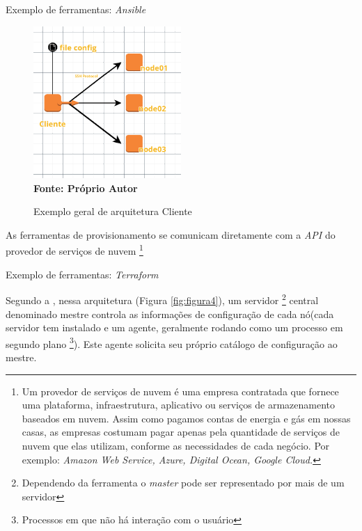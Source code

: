 Exemplo de ferramentas: \textit{Ansible}

\begin{figure}[ht]
	\centering	
	\caption[\hspace{0.1cm}Exemplo arquitetura Cliente]{Exemplo geral de arquitetura Cliente}
	\vspace{-0.4cm}
	\includegraphics[width=0.5\textwidth]{figuras/cliente.png}
	 \vspace{-0.2cm}
	\\\textbf{\footnotesize Fonte: Próprio Autor}
	\label{fig:figura3}
\end{figure}
\vspace{-0.5cm}


As ferramentas de provisionamento se comunicam diretamente com a \textit{API} do provedor de serviços de nuvem \footnote{Um provedor de serviços de nuvem é uma empresa contratada que fornece uma plataforma, infraestrutura, aplicativo ou serviços de armazenamento baseados em nuvem. Assim como pagamos contas de energia e gás em nossas casas, as empresas costumam pagar apenas pela quantidade de serviços de nuvem que elas utilizam, conforme as necessidades de cada negócio. Por exemplo: \textit{Amazon Web Service, Azure, Digital Ocean, Google Cloud.} }

Exemplo de ferramentas: \textit{Terraform}

 
 Segundo a , nessa arquitetura (Figura \ref{fig:figura4}), um servidor \footnote{Dependendo da ferramenta o \textit{master} pode ser representado por mais de um servidor} central denominado mestre controla as informações de configuração de cada nó(cada servidor tem instalado e um agente, geralmente rodando como um processo em segundo plano \footnote{Processos em que não há interação com o usuário}). Este agente solicita seu próprio catálogo de configuração ao mestre.  
 
